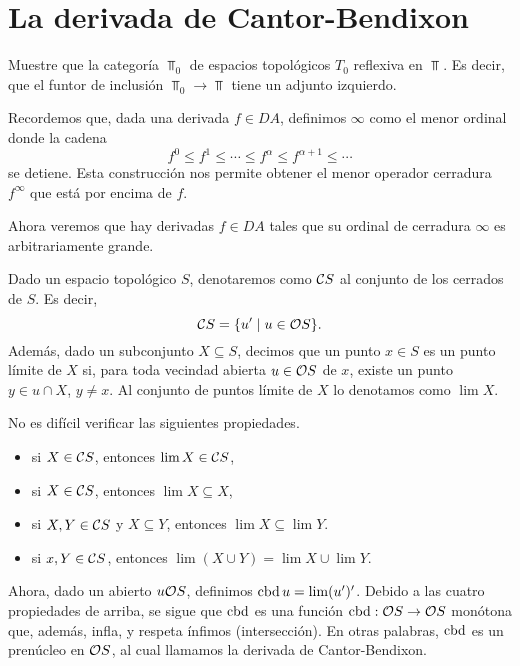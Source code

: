 \chapter{La derivada de Cantor-Bendixon}


\begin{exe}
    Muestre que la categoría $\Top_0$ de espacios topológicos
    $T_0$ reflexiva en $\Top$.
    Es decir, que el funtor de inclusión $\Top_0\to\Top$
    tiene un adjunto izquierdo.
\end{exe}

Recordemos que, dada una derivada $f\in DA$,
definimos $\infty$ como el menor ordinal donde la cadena
\[
    f^0\leq f^1\leq \cdots\leq f^\alpha \leq f^{\alpha+1} \leq \cdots
\]
se detiene.
Esta construcción nos permite obtener
el menor operador cerradura $f^\infty$
que está por encima de $f$.

Ahora veremos que hay derivadas $f\in DA$ tales que
su ordinal de cerradura $\infty$ es arbitrariamente grande.

Dado un espacio topológico $S$,
denotaremos como $\cal CS$ al conjunto de los cerrados de $S$.
Es decir,
\[
    \cal CS = \{u'\mid u\in\cal OS\}
.\]
Además, dado un subconjunto $X\subseteq S$,
decimos que un punto $x\in S$ es un punto límite de $X$ si,
para toda vecindad abierta $u\in\cal OS$ de $x$,
existe un punto $y\in u\cap X$, $y\neq x$.
Al conjunto de puntos límite de $X$ lo denotamos como $\lim X$.

No es difícil verificar las siguientes propiedades.
\begin{itemize}
    \item si $X\in\cal CS$, entonces $\lim X\in\cal CS$,
    \item si $X\in\cal CS$, entonces $\lim X\subseteq X$,
    \item si $X,Y\in\cal CS$ y $X\subseteq Y$,
        entonces $\lim X\subseteq\lim Y$.
    \item si $x,Y\in\cal CS$,
        entonces $\lim(X\cup Y)=\lim X\cup\lim Y$.
\end{itemize}

Ahora, dado un abierto $u\cal OS$, definimos $\cbd u = \lim(u')'$.
Debido a las cuatro propiedades de arriba,
se sigue que $\cbd$ es una función $\cbd:\cal OS\to\cal OS$
monótona que, además, infla, y respeta ínfimos (intersección).
En otras palabras, $\cbd$ es un prenúcleo en $\cal OS$,
al cual llamamos la derivada de Cantor-Bendixon.

